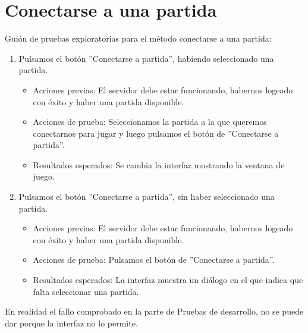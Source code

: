 \section{Conectarse a una partida}

Guión de pruebas exploratorias para el método conectarse a una partida:

\begin{enumerate}
\item Pulsamos el botón ''Conectarse a partida'', habiendo seleccionado una partida.
	\begin{itemize}
	\item Acciones previas: El servidor debe estar funcionando, habernos logeado con éxito y haber una partida disponible.
	\item Acciones de prueba: Seleccionamos la partida a la que queremos conectarnos para jugar y luego pulsamos el botón de ''Conectarse a partida''.
	\item Resultados esperados: Se cambia la interfaz mostrando la ventana de juego.
	\end{itemize}
\item Pulsamos el botón ''Conectarse a partida'', sin haber seleccionado una partida.
	\begin{itemize}
	\item Acciones previas: El servidor debe estar funcionando, habernos logeado con éxito y haber una partida disponible.
	\item Acciones de prueba: Pulsamos el botón de ''Conectarse a partida''.
	\item Resultados esperados: La interfaz muestra un diálogo en el que indica que falta seleccionar una partida.
	\end{itemize}
\end{enumerate}

En realidad el fallo comprobado en la parte de Pruebas de desarrollo, no se puede dar porque la interfaz no lo permite.
